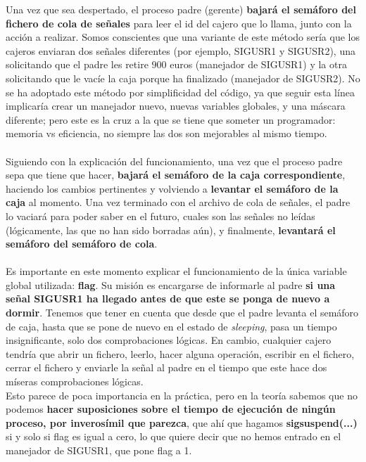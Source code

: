\documentclass[12pt]{article}
\begin{document}
Una vez que sea despertado, el proceso padre (gerente) \textbf{bajará el semáforo del fichero de cola de señales} para leer el id del cajero que lo llama, junto con la acción a realizar. Somos conscientes que una variante de este método sería que los cajeros enviaran dos señales diferentes (por ejemplo, SIGUSR1 y SIGUSR2), una solicitando que el padre les retire $900$ euros (manejador de SIGUSR1) y la otra solicitando que le vacíe la caja porque ha finalizado (manejador de SIGUSR2). No se ha adoptado este método por simplificidad del código, ya que seguir esta línea implicaría crear un manejador nuevo, nuevas variables globales, y una máscara diferente; pero este es la cruz a la que se tiene que someter un programador: memoria vs eficiencia, no siempre las dos son mejorables al mismo tiempo.\\\\
Siguiendo con la explicación del funcionamiento, una vez que el proceso padre sepa que tiene que hacer, \textbf{bajará el semáforo de la caja correspondiente}, haciendo los cambios pertinentes y volviendo a \textbf{levantar el semáforo de la caja} al momento. Una vez terminado con el archivo de cola de señales, el padre lo vaciará para poder saber en el futuro, cuales son las señales no leídas (lógicamente, las que no han sido borradas aún), y finalmente, \textbf{levantará el semáforo del semáforo de cola}.\\\\
Es importante en este momento explicar el funcionamiento de la única variable global utilizada: \textbf{flag}. Su misión es encargarse de informarle al padre \textbf{si una señal SIGUSR1 ha llegado antes de que este se ponga de nuevo a dormir}. Tenemos que tener en cuenta que desde que el padre levanta el semáforo de caja, hasta que se pone de nuevo en el estado de \emph{sleeping}, pasa un tiempo insignificante, solo dos comprobaciones lógicas. En cambio, cualquier cajero tendría que abrir un fichero, leerlo, hacer alguna operación, escribir en el fichero, cerrar el fichero y enviarle la señal al padre en el tiempo que este hace dos míseras comprobaciones lógicas.\\ Esto parece de poca importancia en la práctica, pero en la teoría sabemos que no podemos \textbf{hacer suposiciones sobre el tiempo de ejecución de ningún proceso, por inverosímil que parezca}, que ahí que hagamos \textbf{sigsuspend(...)} si y solo si flag es igual a cero, lo que quiere decir que no hemos entrado en el manejador de SIGUSR1, que pone flag a 1.\\\\
\end{document}
